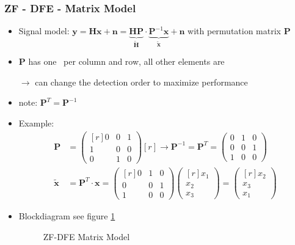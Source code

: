 \documentclass[a4paper, 10pt]{article}
\begin{document}
\subsubsection{ZF - DFE - Matrix Model}
\begin{itemize}
	\item Signal model: $ \mathbf{y} = \mathbf{Hx} + \mathbf{n} = \underbrace{\mathbf{HP}}_{\tilde{\mathbf{H}}}\cdot\underbrace{\mathbf{P}^{-1}\mathbf{x}}_{\tilde{\mathbf{x}}} + \mathbf{n} $ with permutation matrix $\mathbf{P} $
	\item $\mathbf{P} $ has one \grqq\, per column and row, all other elements are \grqq 
	\item[$\rightarrow$] can change the detection order to maximize performance
	\item note: $\mathbf{P}^T = \mathbf{P}^{-1} $
	\item Example: 
	\begin{align*}
		\mathbf{P} &= \begin{pmatrix*}[r] 0 & 0 & 1\\1 & 0 & 0\\ 0 & 1 & 0	\end{pmatrix*}[r] \rightarrow \mathbf{P}^{-1} = \mathbf{P}^T = \begin{pmatrix*}0 & 1 & 0\\0 & 0 & 1\\ 1 & 0 & 0\end{pmatrix*}\\
		\tilde{\mathbf{x}} &= \mathbf{P}^T\cdot\mathbf{x} = \begin{pmatrix*}[r] 0 & 1 & 0\\ 0 & 0 & 1\\ 1 & 0 & 0\end{pmatrix*}\begin{pmatrix*}[r]x_1 \\x_2\\x_3\end{pmatrix*} = \begin{pmatrix*}[r]x_2\\x_3\\x_1\end{pmatrix*}
	\end{align*}
	\item Blockdiagram see figure \ref{ZF-DFE-Matrix}
	\begin{figure}
		\centering
		\resizebox{\textwidth}{!}{}
		\caption{ZF-DFE Matrix Model}
		\label{ZF-DFE-Matrix}
	\end{figure}

\end{itemize}
\end{document}
